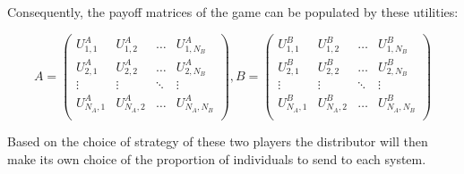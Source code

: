 Consequently, the payoff matrices of the game can be populated by these 
utilities:

\begin{equation} \label{eq:payoff-matrices}
    A = 
    \begin{pmatrix}
        U_{1,1}^A & U_{1,2}^A & \dots & U_{1,N_B}^A \\
        U_{2,1}^A & U_{2,2}^A & \dots & U_{2,N_B}^A \\
        \vdots & \vdots & \ddots & \vdots \\
        U_{N_A,1}^A & U_{N_A,2}^A & \dots & U_{N_A,N_B}^A \\
    \end{pmatrix},
    B = 
    \begin{pmatrix}
        U_{1,1}^B & U_{1,2}^B & \dots & U_{1,N_B}^B \\
        U_{2,1}^B & U_{2,2}^B & \dots & U_{2,N_B}^B \\
        \vdots & \vdots & \ddots & \vdots \\
        U_{N_A,1}^B & U_{N_A,2}^B & \dots & U_{N_A,N_B}^B \\
    \end{pmatrix}
\end{equation}

Based on the choice of strategy of these two players the distributor will then 
make its own choice of the proportion of individuals to send to each system.
